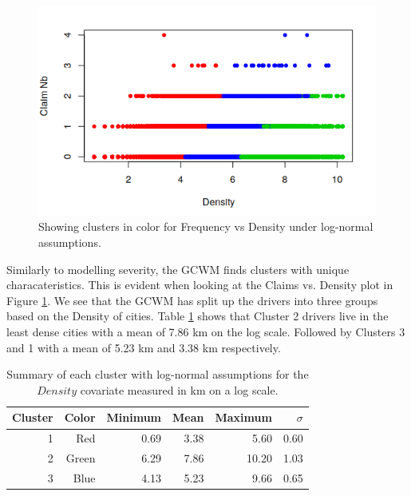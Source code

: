 \documentclass[11pt,letterpaper]{article}
\numberwithin{equation}{section}
\numberwithin{equation}{section}
\numberwithin{equation}{section}
\begin{document}
\begin{figure}[!ht]
\begin{center}
\caption{Showing clusters in color for Frequency vs Density under log-normal assumptions.}
\label{frequencyGraph}
\includegraphics[scale=0.80]{frequency.png}
\end{center}
\end{figure}

Similarly to modelling severity, the GCWM finds clusters with unique characateristics. This is evident when looking at the Claims vs. Density plot in Figure \ref{frequencyGraph}. We see that the GCWM has split up the drivers into three groups based on the Density of cities. Table \ref{summarycovariates} shows that Cluster 2 drivers live in the least dense cities with a mean of 7.86 km on the log scale. Followed by Clusters 3 and 1 with a mean of 5.23 km and 3.38 km respectively.

 \begin{table}[!htb]
 \begin{center}
 \caption{Summary of each cluster with log-normal assumptions for the $Density$ covariate measured in km on a log scale.} \label{summarycovariates}
\begin{tabular}{rrrrrr}
\hline
\hline
Cluster  & Color & Minimum & Mean & Maximum & $\sigma$  \\
\hline
1 &   Red         & 0.69    & 3.38 & 5.60    & 0.60  \\
2 &  Green       & 6.29    & 7.86 & 10.20   & 1.03  \\
3 &  Blue        & 4.13    & 5.23 & 9.66    & 0.65 \\
\hline\hline
\end{tabular}
\end{center}
\end{table}
\end{document}

